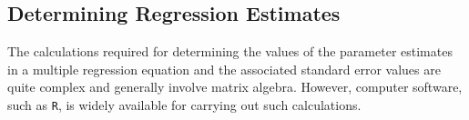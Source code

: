 
\subsection*{Determining Regression Estimates}

The calculations required for determining the values of the parameter estimates in a multiple regression equation and the associated standard error values are quite complex and generally involve matrix algebra. However, computer software, such as \texttt{R}, is widely available for carrying out such calculations.





 